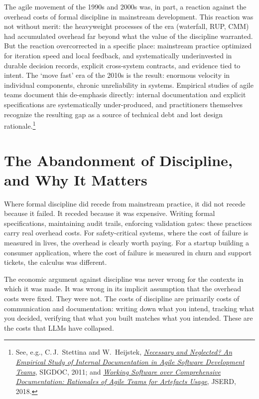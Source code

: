\documentclass[11pt, a4paper]{article}
\begin{document}
The agile movement of the 1990s and 2000s was, in part, a reaction against the overhead
costs of formal discipline in mainstream development. This reaction was not without merit:
the heavyweight processes of the era (waterfall, RUP, CMM) had accumulated overhead far
beyond what the value of the discipline warranted. But the reaction overcorrected in a
specific place: mainstream practice optimized for iteration speed and local feedback,
and systematically underinvested in durable decision records, explicit cross-system
contracts, and evidence tied to intent. The `move fast' era of the 2010s
is the result: enormous velocity in individual components, chronic unreliability in
systems. Empirical studies of agile teams document this de-emphasis directly: internal
documentation and explicit specifications are systematically under-produced, and
practitioners themselves recognize the resulting gap as a source of technical debt and
lost design rationale.\footnote{See, e.g., C.\,J.~Stettina and W.~Heijstek,
\href{https://doi.org/10.1145/2038476.2038509}{\textit{Necessary and Neglected? An
Empirical Study of Internal Documentation in Agile Software Development Teams}}, SIGDOC,
2011; and \href{https://doi.org/10.1186/s40411-018-0051-7}{\textit{Working Software over
Comprehensive Documentation: Rationales of Agile Teams for Artefacts Usage}}, JSERD,
2018.}

\section{The Abandonment of Discipline, and Why It Matters}

Where formal discipline did recede from mainstream practice, it did not recede because
it failed. It receded because it was expensive. Writing formal specifications,
maintaining audit
trails, enforcing validation gates: these practices carry real overhead costs. For
safety-critical systems, where the cost of failure is measured in lives, the overhead is
clearly worth paying. For a startup building a consumer application, where the cost of
failure is measured in churn and support tickets, the calculus was different.

The economic argument against discipline was never wrong for the contexts in which it was
made. It was wrong in its implicit assumption that the overhead costs were fixed. They
were not. The costs of discipline are primarily costs of communication and documentation:
writing down what you intend, tracking what you decided, verifying that what you built
matches what you intended. These are the costs that LLMs have collapsed.
\end{document}
